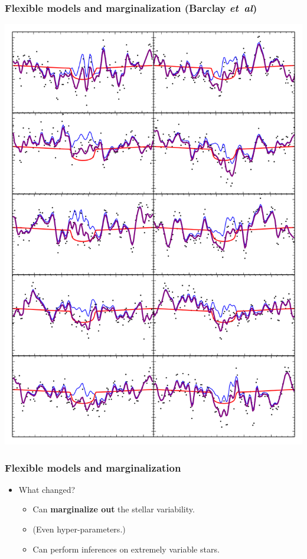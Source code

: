 \documentclass[aspectratio=169]{beamer}
\newcommand{\foreign}[1]{\textsl{#1}}
\newcommand{\etal}{\foreign{et~al}}
\renewcommand{\emph}[1]{\textbf{#1}}
\begin{document}
\begin{frame}
  \frametitle{Flexible models and marginalization \small{(Barclay \etal)}}
  \includegraphics[height=0.85\textheight]{ten_transits.png}
\end{frame}

\begin{frame}
  \frametitle{Flexible models and marginalization}
  \begin{itemize}
  \item What changed?
    \begin{itemize}
    \item Can \emph{marginalize out} the stellar variability.
    \item (Even hyper-parameters.)
    \item Can perform inferences on extremely variable stars.
    \end{itemize}
  \end{itemize}
\end{frame}
\end{document}
